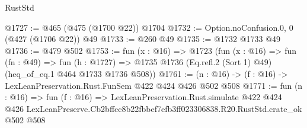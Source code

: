 \begin{lexlean}{RustStd}
\begin{coremodule}
@1727 := @465 (@475 (@1700 @22)) @1704
@1732 := Option.noConfusion.{0, 0} (@427 (@1706 @22)) @49
@1733 := @260 @49
@1735 := @1732 @1733 @49
@1736 := @479 @502
@1753 := fun (x : @16) =>
  @1723
    (fun (x : @16) =>
    fun (fn : @49) =>
    fun (h : @1727) => @1735 @1736 (Eq.refl.{2} (Sort 1) @49) (heq_of_eq.{1} @464 @1733 @1736 @508))
@1761 := (n : @16) -> (f : @16) -> LexLeanPreservation.Rust.FunSem @422 @424 @426 @502 @508
@1771 := fun (n : @16) =>
  fun (f : @16) =>
  LexLeanPreservation.Rust.simulate
    @422
    @424
    @426
    LexLeanPreserve.Cb2bffcc8b22fbbef7efb3ff023306838.R20.RustStd.crate_ok
    @502
    @508
\end{coremodule}
\end{lexlean}
